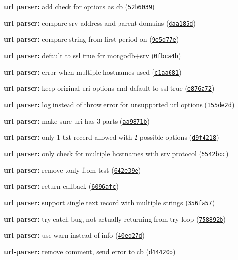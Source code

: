 \begin{DoxyItemize}
\item {\bfseries url parser\+:} add check for options as cb (\href{https://github.com/mongodb/node-mongodb-native/commit/52b6039}{\tt 52b6039})
\item {\bfseries url parser\+:} compare srv address and parent domains (\href{https://github.com/mongodb/node-mongodb-native/commit/daa186d}{\tt daa186d})
\item {\bfseries url parser\+:} compare string from first period on (\href{https://github.com/mongodb/node-mongodb-native/commit/9e5d77e}{\tt 9e5d77e})
\item {\bfseries url parser\+:} default to ssl true for mongodb+srv (\href{https://github.com/mongodb/node-mongodb-native/commit/0fbca4b}{\tt 0fbca4b})
\item {\bfseries url parser\+:} error when multiple hostnames used (\href{https://github.com/mongodb/node-mongodb-native/commit/c1aa681}{\tt c1aa681})
\item {\bfseries url parser\+:} keep original uri options and default to ssl true (\href{https://github.com/mongodb/node-mongodb-native/commit/e876a72}{\tt e876a72})
\item {\bfseries url parser\+:} log instead of throw error for unsupported url options (\href{https://github.com/mongodb/node-mongodb-native/commit/155de2d}{\tt 155de2d})
\item {\bfseries url parser\+:} make sure uri has 3 parts (\href{https://github.com/mongodb/node-mongodb-native/commit/aa9871b}{\tt aa9871b})
\item {\bfseries url parser\+:} only 1 txt record allowed with 2 possible options (\href{https://github.com/mongodb/node-mongodb-native/commit/d9f4218}{\tt d9f4218})
\item {\bfseries url parser\+:} only check for multiple hostnames with srv protocol (\href{https://github.com/mongodb/node-mongodb-native/commit/5542bcc}{\tt 5542bcc})
\item {\bfseries url parser\+:} remove .only from test (\href{https://github.com/mongodb/node-mongodb-native/commit/642e39e}{\tt 642e39e})
\item {\bfseries url parser\+:} return callback (\href{https://github.com/mongodb/node-mongodb-native/commit/6096afc}{\tt 6096afc})
\item {\bfseries url parser\+:} support single text record with multiple strings (\href{https://github.com/mongodb/node-mongodb-native/commit/356fa57}{\tt 356fa57})
\item {\bfseries url parser\+:} try catch bug, not actually returning from try loop (\href{https://github.com/mongodb/node-mongodb-native/commit/758892b}{\tt 758892b})
\item {\bfseries url parser\+:} use warn instead of info (\href{https://github.com/mongodb/node-mongodb-native/commit/40ed27d}{\tt 40ed27d})
\item {\bfseries url-\/parser\+:} remove comment, send error to cb (\href{https://github.com/mongodb/node-mongodb-native/commit/d44420b}{\tt d44420b})
\end{DoxyItemize}

